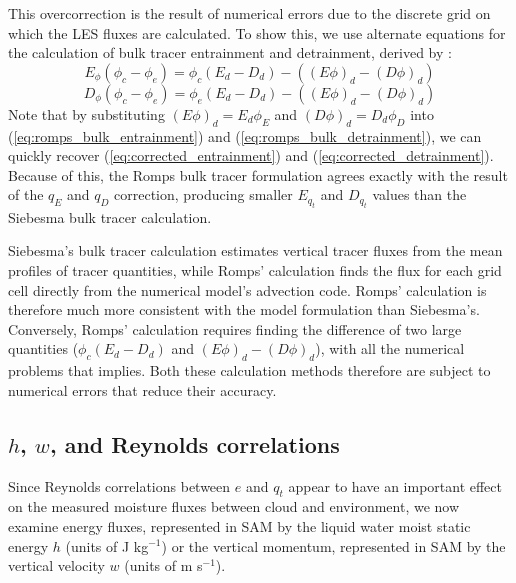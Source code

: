 \documentclass[draft,grl]{agutex}
\begin{document}
\begin{article}
This overcorrection is the result of numerical errors due to the discrete 
grid on which the LES fluxes are calculated.  To show this, we use alternate 
equations for the calculation of bulk tracer entrainment and detrainment, 
derived by \cite{Romps2010}:
\begin{equation}
  \label{eq:romps_bulk_entrainment}
    E_{\phi}(\phi_c - \phi_e) = \phi_c(E_d-D_d) - ((E\phi)_d - (D\phi)_d)
\end{equation}
\begin{equation}
  \label{eq:romps_bulk_detrainment}
    D_{\phi}(\phi_c - \phi_e) = \phi_e(E_d-D_d) - ((E\phi)_d - (D\phi)_d)
\end{equation}
Note that by substituting $(E\phi)_d = E_d \phi_E$ and $(D\phi)_d = D_d \phi_D$ 
into (\ref{eq:romps_bulk_entrainment}) and (\ref{eq:romps_bulk_detrainment}),
we can quickly recover (\ref{eq:corrected_entrainment}) and 
(\ref{eq:corrected_detrainment}).  Because of this, the Romps bulk tracer 
formulation agrees exactly with the result of the $q_E$ and $q_D$ correction,
producing smaller $E_{q_t}$ and $D_{q_t}$ values than the Siebesma bulk tracer 
calculation.  

Siebesma's bulk tracer calculation estimates vertical tracer fluxes from the 
mean profiles of tracer quantities, while Romps' calculation finds the flux for 
each grid cell directly from the numerical model's advection code.  Romps' 
calculation is therefore much more consistent with the model formulation than 
Siebesma's.  Conversely, Romps' calculation requires finding the difference of 
two large quantities ($\phi_c(E_d-D_d)$ and $(E\phi)_d - (D\phi)_d$), with all 
the numerical problems that implies.  Both these calculation methods therefore 
are subject to numerical errors that reduce their accuracy.  


\subsection{$h$, $w$, and Reynolds correlations}

Since Reynolds correlations between $e$ and $q_t$ appear to have an important 
effect on the measured moisture fluxes between cloud and environment, we now 
examine energy fluxes, represented in SAM by the liquid water moist static 
energy $h$ (units of J kg$^{-1}$) or the vertical momentum, represented in SAM 
by the vertical velocity $w$ (units of m s$^{-1}$).


\end{article}
\end{document}
